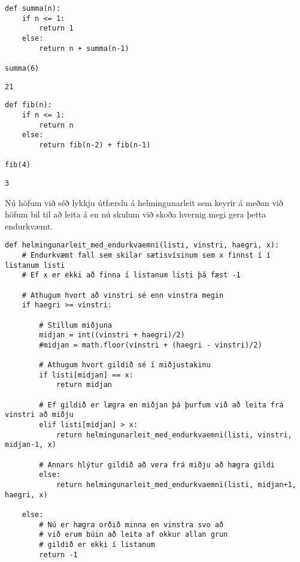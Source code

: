 \begin{lstlisting}[caption=Summa reiknuð endurkvæmt, label=lst:reiknirit-endurkvæmni-summa]
def summa(n):
	if n <= 1:
		return 1
	else:
		return n + summa(n-1)

summa(6)
\end{lstlisting}
\lstset{style=uttak}
\begin{lstlisting}
21
\end{lstlisting}
\lstset{style=venjulegt}

\begin{lstlisting}[caption=Fibonacci tölur reiknaðar endurkvæmt, label=lst:reiknirit-endurkvæmni-fib]
def fib(n):
	if n <= 1:
		return n
	else:
		return fib(n-2) + fib(n-1)

fib(4)
\end{lstlisting}
\lstset{style=uttak}
\begin{lstlisting}
3
\end{lstlisting}
\lstset{style=venjulegt}


Nú höfum við séð lykkju útfærslu á helmingunarleit sem keyrir á meðan við höfum bil til að leita á en nú skulum við skoða hvernig megi gera þetta endurkvæmt.

\begin{lstlisting}[caption=Helmingunarleit að tölu í röðuðum lista með endurkvæmni, label=lst:reiknirit-helm-end]
def helmingunarleit_med_endurkvaemni(listi, vinstri, haegri, x): 
	# Endurkvæmt fall sem skilar sætisvísinum sem x finnst í í listanum listi
	# Ef x er ekki að finna í listanum listi þá fæst -1
	
	# Athugum hvort að vinstri sé enn vinstra megin
	if haegri >= vinstri: 
	
		# Stillum miðjuna
		midjan = int((vinstri + haegri)/2)
		#midjan = math.floor(vinstri + (haegri - vinstri)/2)
		
		# Athugum hvort gildið sé í miðjustakinu
		if listi[midjan] == x: 
			return midjan 
		
		# Ef gildið er lægra en miðjan þá þurfum við að leita frá vinstri að miðju
		elif listi[midjan] > x: 
			return helmingunarleit_med_endurkvaemni(listi, vinstri, midjan-1, x) 
	
		# Annars hlýtur gildið að vera frá miðju að hægra gildi
		else: 
			return helmingunarleit_med_endurkvaemni(listi, midjan+1, haegri, x) 
	
	else: 
		# Nú er hægra orðið minna en vinstra svo að
		# við erum búin að leita af okkur allan grun
		# gildið er ekki í listanum
		return -1
\end{lstlisting}


